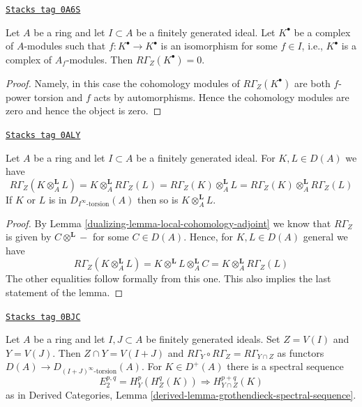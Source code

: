 \begin{lemma}
\label{dualizing-lemma-local-cohomology-vanishes}
\href{https://stacks.math.columbia.edu/tag/0A6S}{\texttt{Stacks tag 0A6S}}

Let $A$ be a ring and let $I \subset A$ be a finitely generated ideal.
Let $K^\bullet$ be a complex of $A$-modules such that
$f : K^\bullet \to K^\bullet$ is an isomorphism for some
$f \in I$, i.e., $K^\bullet$ is a complex of $A_f$-modules. Then
$R\Gamma_Z(K^\bullet) = 0$.
\end{lemma}

\begin{proof}
Namely, in this case the cohomology modules of $R\Gamma_Z(K^\bullet)$
are both $f$-power torsion and $f$ acts by automorphisms. Hence the
cohomology modules are zero and hence the object is zero.
\end{proof}

\begin{lemma}
\label{dualizing-lemma-torsion-tensor-product}
\href{https://stacks.math.columbia.edu/tag/0ALY}{\texttt{Stacks tag 0ALY}}

Let $A$ be a ring and let $I \subset A$ be a finitely generated ideal.
For $K, L \in D(A)$ we have
$$
R\Gamma_Z(K \otimes_A^\mathbf{L} L) =
K \otimes_A^\mathbf{L} R\Gamma_Z(L) =
R\Gamma_Z(K) \otimes_A^\mathbf{L} L =
R\Gamma_Z(K) \otimes_A^\mathbf{L} R\Gamma_Z(L)
$$
If $K$ or $L$ is in $D_{I^\infty\text{-torsion}}(A)$ then so is
$K \otimes_A^\mathbf{L} L$.
\end{lemma}

\begin{proof}

By Lemma \ref{dualizing-lemma-local-cohomology-adjoint} we know that
$R\Gamma_Z$ is given by $C \otimes^\mathbf{L} -$ for some $C \in D(A)$.
Hence, for $K, L \in D(A)$ general we have
$$
R\Gamma_Z(K \otimes_A^\mathbf{L} L) =
K \otimes^\mathbf{L} L \otimes_A^\mathbf{L} C =
K \otimes_A^\mathbf{L} R\Gamma_Z(L)
$$
The other equalities follow formally from this one. This also implies
the last statement of the lemma.
\end{proof}

\begin{lemma}
\label{dualizing-lemma-local-cohomology-ss}
\href{https://stacks.math.columbia.edu/tag/0BJC}{\texttt{Stacks tag 0BJC}}

Let $A$ be a ring and let $I, J \subset A$ be finitely generated
ideals. Set $Z = V(I)$ and $Y = V(J)$. Then $Z \cap Y = V(I + J)$
and $R\Gamma_Y \circ R\Gamma_Z = R\Gamma_{Y \cap Z}$ as functors
$D(A) \to D_{(I + J)^\infty\text{-torsion}}(A)$. For $K \in D^+(A)$
there is a spectral sequence
$$
E_2^{p, q} = H^p_Y(H^q_Z(K)) \Rightarrow H^{p + q}_{Y \cap Z}(K)
$$
as in Derived Categories, Lemma
\ref{derived-lemma-grothendieck-spectral-sequence}.
\end{lemma}

